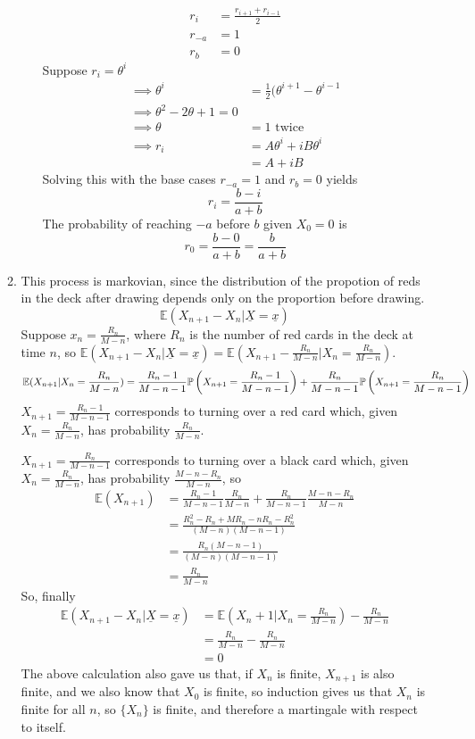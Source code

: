 \documentclass{article}
\begin{document}
\begin{enumerate}
\begin{enumerate}
\begin{enumerate}
\begin{align*}
r_i &= \frac{r_{i+1}+r_{i-1}}{2}\\
r_{-a} &= 1\\
r_b &= 0
\end{align*}
Suppose $r_i= \theta^i$
\begin{align*}
\implies \theta^i &= \frac{1}{2}(\theta^{i+1}-\theta^{i-1}\\
\implies \theta^2 -2\theta +1 = 0\\
\implies \theta &= 1 \mbox{ twice}\\
\implies r_i &= A\theta^i +iB\theta^i\\
&= A+iB
\end{align*}
Solving this with the base cases $r_{-a}=1$ and $r_{b}=0$ yields
$$
r_i = \frac{b-i}{a+b}
$$
The probability of reaching $-a$ before $b$ given $X_0 = 0$ is
$$
r_0 = \frac{b-0}{a+b} = \frac{b}{a+b}
$$
\end{enumerate}
\item
This process is markovian, since the distribution of the propotion of reds in the deck after drawing depends only on the proportion before drawing.
$$
\mathbb{E}(X_{n+1} - X_n | \underline{X} = \underline{x})
$$
Suppose $x_n = \frac{R_n}{M-n}$, where $R_n$ is the number of red cards in the deck at time $n$, so $\mathbb{E}(X_{n+1} - X_n | \underline{X} = \underline{x}) = \mathbb{E}(X_{n+1} - \frac{R_n}{M-n}| X_n = \frac{R_n}{M-n})$.
$$
\mathbb{E}(X_{n+1} | X_n = \frac{R_n}{M-n}) = \frac{R_n-1}{M-n-1}\mathbb{P}\left(X_{n+1} = \frac{R_n-1}{M-n-1}\right) + \frac{R_n}{M-n-1} \mathbb{P} \left( X_{n+1} = \frac{R_n}{M-n-1}\right)
$$
$X_{n+1} = \frac{R_n-1}{M-n-1}$ corresponds to turning over a red card which, given $X_n = \frac{R_n}{M-n}$, has probability $\frac{R_n}{M-n}$.

$X_{n+1} = \frac{R_n}{M-n-1}$ corresponds to turning over a black card which, given $X_n = \frac{R_n}{M-n}$, has probability $\frac{M-n-R_n}{M-n}$, so
\begin{align*}
\mathbb{E}(X_{n+1}) &= \frac{R_n-1}{M-n-1}\frac{R_n}{M-n} + \frac{R_n}{M-n-1} \frac{M-n-R_n}{M-n}\\
&= \frac{R_n^2 - R_n + MR_n - nR_n - R_n^2}{(M-n)(M-n-1)}\\
&= \frac{R_n(M-n-1)}{(M-n)(M-n-1)}\\
&= \frac{R_n}{M-n}
\end{align*}
So, finally
\begin{align*}
\mathbb{E}(X_{n+1}-X_n | \underline{X} = \underline{x}) &= \mathbb{E}\left(X_n+1|X_n = \frac{R_n}{M-n}\right) - \frac{R_n}{M-n}\\
&= \frac{R_n}{M-n} - \frac{R_n}{M-n}\\
&= 0
\end{align*}
The above calculation also gave us that, if $X_n$ is finite, $X_{n+1}$ is also finite, and we also know that $X_0$ is finite, so induction gives us that $X_n$ is finite for all $n$, so $\{X_n\}$ is finite, and therefore a martingale with respect to itself.
\end{enumerate}
\end{enumerate}
\clearpage
\end{document}

